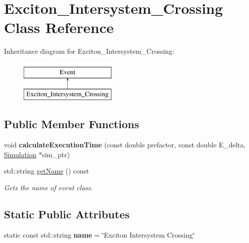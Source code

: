 \hypertarget{class_exciton___intersystem___crossing}{}\section{Exciton\+\_\+\+Intersystem\+\_\+\+Crossing Class Reference}
\label{class_exciton___intersystem___crossing}
Inheritance diagram for Exciton\+\_\+\+Intersystem\+\_\+\+Crossing\+:\begin{figure}[H]
\begin{center}
\leavevmode
\includegraphics[height=2.000000cm]{class_exciton___intersystem___crossing}
\end{center}
\end{figure}
\subsection*{Public Member Functions}
\begin{DoxyCompactItemize}
\item 
\mbox{\label{class_exciton___intersystem___crossing_a7c4cd9f72c1fde140678a8e9bce18d81}} 
void {\bfseries calculate\+Execution\+Time} (const double prefactor, const double E\+\_\+delta, \hyperlink{class_simulation}{Simulation} $\ast$sim\+\_\+ptr)
\item 
std\+::string \hyperlink{class_exciton___intersystem___crossing_aa9a743fa3ab0ebc24abeaacef0590488}{get\+Name} () const
\begin{DoxyCompactList}\small\item\em Gets the name of event class. \end{DoxyCompactList}\end{DoxyCompactItemize}
\subsection*{Static Public Attributes}
\begin{DoxyCompactItemize}
\item 
\mbox{\label{class_exciton___intersystem___crossing_a4c9578265b37f2ab24f1747de3a1f2a2}} 
static const std\+::string {\bfseries name} = \char`\"{}Exciton Intersystem Crossing\char`\"{}
\end{DoxyCompactItemize}


